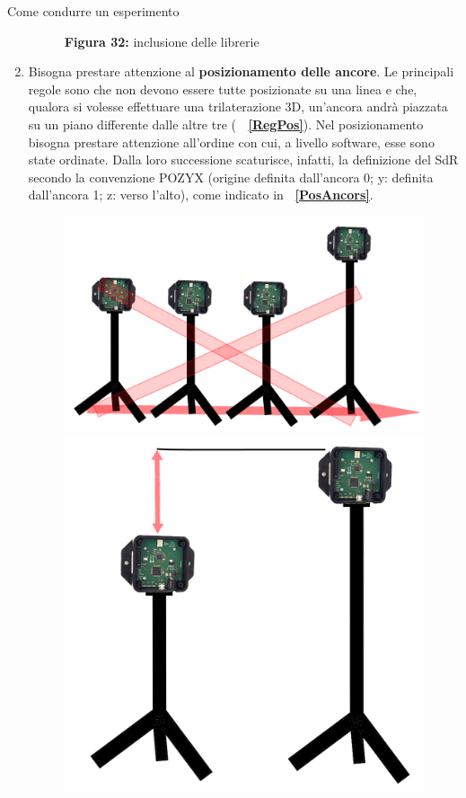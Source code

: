 \documentclass[12pt]{report}
\begin{document}
\begin{section}{Come condurre un esperimento}
\begin{enumerate}
\begin{figure}[H]
						\caption{\textbf{Figura 32:} inclusione delle librerie\label{Cattura}}
					\end{figure} 
				\item Bisogna prestare attenzione al \textbf{posizionamento delle ancore}. Le principali regole sono che non devono essere tutte posizionate su una linea e che, qualora si volesse effettuare una trilaterazione 3D, un'ancora andrà piazzata su un piano differente dalle altre tre (\textbf{\figurename~												\ref{RegPos}}). Nel posizionamento bisogna prestare attenzione all'ordine con cui, a livello software, esse sono state ordinate. Dalla loro successione scaturisce, infatti, la definizione del SdR secondo la convenzione POZYX (origine definita dall'ancora 0; y: definita dall'ancora 1; z: verso l'alto), come 									indicato in \textbf{\figurename~\ref{PosAncors}}.
					\begin{figure}[H]
						\centering
						\includegraphics[scale=0.2]{NoLine}
						\includegraphics[scale=0.2]{DiffAncors}

\end{figure}
\end{enumerate}
\end{section}
\end{document}
